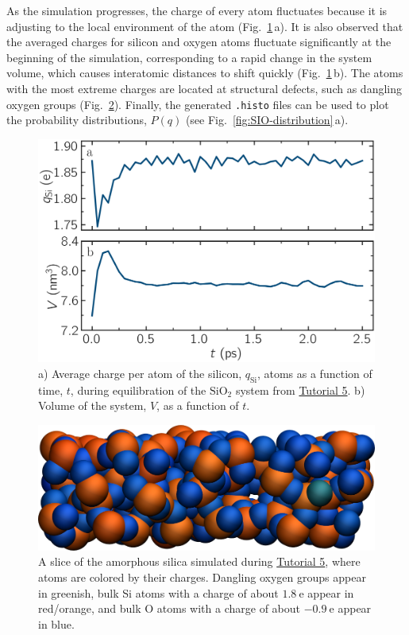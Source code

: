 \documentclass[9pt,tutorial]{livecoms}
\newcommand{\flecmd}[1]{\textcolor{command}{\texttt{#1}}} %
\begin{document}
As the simulation progresses, the charge of every atom fluctuates
because it is adjusting to the local environment of the atom (Fig.~\ref{fig:SIO-charge}\,a).
It is also observed that the averaged charges for silicon and oxygen
atoms fluctuate significantly at the beginning of the simulation, corresponding
to a rapid change in the system volume, which causes interatomic distances to
shift quickly (Fig.~\ref{fig:SIO-charge}\,b).  The atoms with the
most extreme charges are located at structural defects,
such as dangling oxygen groups (Fig.~\ref{fig:SIO-slice}).
Finally, the generated \flecmd{.histo} files can be used to
plot the probability distributions, $P(q)$ (see Fig.~\ref{fig:SIO-distribution}\,a).

\begin{figure}
\centering
\includegraphics[width=\linewidth]{SIO-charge}
\caption{a) Average charge per atom of the silicon, $q_\text{Si}$, atoms as
a function of time, $t$, during equilibration of the $\text{SiO}_2$ system
from \hyperref[reactive-silicon-dioxide-label]{Tutorial 5}.  b) Volume of the
system, $V$, as a function of $t$.}
\label{fig:SIO-charge}
\end{figure}

\begin{figure}
\includegraphics[width=\linewidth]{SIO-slice}
\caption{A slice of the amorphous silica simulated during
\hyperref[reactive-silicon-dioxide-label]{Tutorial 5}, where atoms are colored by their charges.
Dangling oxygen groups appear in greenish, bulk Si atoms with a charge of about
$1.8~\text{e}$  appear in red/orange, and bulk O atoms with a charge of about
$-0.9~\text{e}$ appear in blue.}
\label{fig:SIO-slice}
\end{figure}
\end{document}
